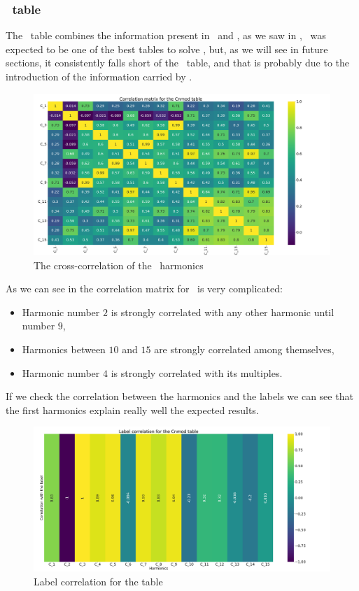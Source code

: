 \subsubsection{\cnmod\ table}
The \cnmod\ table combines the information present in \an\ and \bn, as we saw in ,
\cnmod\ was expected to be one of the best tables to solve \qrp, but, as we will see in future
sections, it consistently falls short of the \an\ table, and that is probably due to the
introduction of the information carried by \bn.
\begin{figure}[h!]
	\centering
	\includegraphics[width=\linewidth]{img/Cnmod_corr_matrix.png}
	\caption{The cross-correlation of the \cnmod\ harmonics} \label{fig:cnmod-corr}
\end{figure}

As we can see in  the correlation matrix for \cnmod\ is very complicated:
\begin{itemize}
	\item Harmonic number $2$ is strongly correlated with any other harmonic until number $9$,
	\item Harmonics between $10$ and $15$ are strongly correlated among themselves,
	\item Harmonic number $4$ is strongly correlated with its multiples.
\end{itemize}

If we check the correlation between the harmonics and the labels  we can see
that the first harmonics explain really well the expected results.
\begin{figure}[h!]
	\centering
	\includegraphics[width=\linewidth]{img/Cnmod_label_corr.png}
	\caption{Label correlation for the \cnmod table} \label{fig:cnmod-lcorr}
\end{figure}

